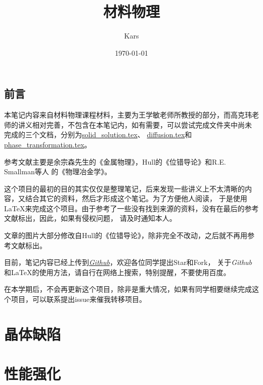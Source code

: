 \documentclass[12pt]{book}
\title{材料物理}
\author{Kars}
\date{\today}
\numberwithin{equation}{section}
\begin{document}
\maketitle




\clearpage

\chapter*{前言}
	本笔记内容来自材料物理课程材料，主要为王学敏老师所教授的部分，而高克玮老师的讲义相对完善，不包含在本笔记内，如有需要，可以尝试完成文件夹中尚未
	完成的三个文档，分别为\href{https://github.com/lkmpoijn/Material_Physics/blob/origin/Chapters/solid_solution.tex}{solid\_solution.tex}、
	\href{https://github.com/lkmpoijn/Material_Physics/blob/origin/Chapters/diffusion.tex}{diffusion.tex}和
	\href{https://github.com/lkmpoijn/Material_Physics/blob/origin/Chapters/phase_transformation.tex}{phase\_transformation.tex}。
	
	参考文献主要是余宗森先生的《金属物理》\cite{余宗森1982高等学校教学用书}，Hull的《位错导论》\cite{HULL201143}和R.E. Smallman等人
	的《物理冶金学》\cite{ngan2007physical}。

	这个项目的最初的目的其实仅仅是整理笔记，后来发现一些讲义上不太清晰的内容，又结合其它的资料，然后才形成这个笔记。为了方便他人阅读，
	于是使用\LaTeX 来完成这个项目。由于参考了一些没有找到来源的资料，没有在最后的参考文献标出，因此，如果有侵权问题，
	请及时通知本人。

	文章的图片大部分修改自Hull的《位错导论》\cite{HULL2011137}，除非完全不改动，之后就不再用参考文献标出。

	目前，笔记内容已经上传到\href{https://github.com/lkmpoijn/Material_Physics}{\emph{Github}}，欢迎各位同学提出Star和Fork，
	关于\emph{Github}和\LaTeX 的使用方法，请自行在网络上搜索，特别提醒，不要使用百度。

	在本学期后，不会再更新这个项目，除非是重大情况，如果有同学相要继续完成这个项目，可以联系提出issue来催我转移项目。

\tableofcontents
{}
	

\part{晶体缺陷}
	
	
	
\part{性能强化}
	
	
	
	
\end{document}
